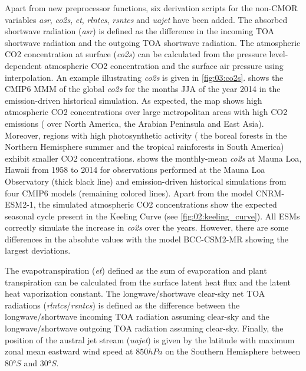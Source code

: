 Apart from new preprocessor functions, six derivation scripts for the
non-\ac{CMOR} variables \emph{asr}, \emph{co2s}, \emph{et}, \emph{rlntcs},
\emph{rsntcs} and \emph{uajet} have been added. The absorbed shortwave
radiation (\emph{asr}) is defined as the difference in the incoming \ac{TOA}
shortwave radiation and the outgoing \ac{TOA} shortwave radiation. The
atmospheric \ac{CO2} concentration at surface (\emph{co2s}) can be calculated
from the pressure level-dependent atmospheric \ac{CO2} concentration and the
surface air pressure using interpolation. An example illustrating \emph{co2s}
is given in \cref{fig:03:co2s}.  shows the \acs{CMIP}6
\ac{MMM} of the global \emph{co2s} for the months \acf{JJA} of the year 2014 in
the emission-driven historical simulation. As expected, the map shows high
atmospheric \ac{CO2} concentrations over large metropolitan areas with high
\ac{CO2} emissions (\eg{} over North America, the Arabian Peninsula and East
Asia). Moreover, regions with high photosynthetic activity (\eg{} the boreal
forests in the Northern Hemisphere summer and the tropical rainforests in South
America) exhibit smaller \ac{CO2} concentrations.  shows
the monthly-mean \emph{co2s} at Mauna Loa, Hawaii from 1958 to 2014 for
observations performed at the Mauna Loa Observatory \autocite{Keeling2005}
(thick black line) and emission-driven historical simulations from four
\acs{CMIP}6 models (remaining colored lines). Apart from the model CNRM-ESM2-1,
the simulated atmospheric \ac{CO2} concentrations show the expected seasonal
cycle present in the Keeling Curve (see \cref{fig:02:keeling_curve}). All
\acp{ESM} correctly simulate the increase in \emph{co2s} over the years.
However, there are some differences in the absolute values with the model
BCC-CSM2-MR showing the largest deviations.

The evapotranspiration (\emph{et}) defined as the sum of evaporation and plant
transpiration can be calculated from the surface latent heat flux and the
latent heat vaporization constant. The longwave/shortwave clear-sky net
\acf{TOA} radiations (\emph{rlntcs}/\emph{rsntcs}) is defined as the difference
between the longwave/shortwave incoming \ac{TOA} radiation assuming clear-sky
and the longwave/shortwave outgoing \ac{TOA} radiation assuming clear-sky.
Finally, the position of the austral jet stream (\emph{uajet}) is given by the
latitude with maximum zonal mean eastward wind speed at $850 \unit{hPa}$ on the
Southern Hemisphere between $80 \unit{\degree S}$ and $30 \unit{\degree S}$.


